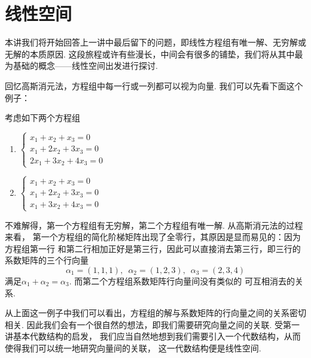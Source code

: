 \chapter{线性空间}

本讲我们将开始回答上一讲中最后留下的问题，即线性方程组有唯一解、无穷解或无解的本质原因.
这段旅程或许有些漫长，中间会有很多的铺垫，我们将从其中最为基础的概念——线性空间出发进行探讨.

回忆高斯消元法，方程组中每一行或一列都可以视为向量. 我们可以先看下面这个例子：
\begin{example}\label{ex:2:线性空间引入}
    考虑如下两个方程组
    \begin{multicols}{2}
        \begin{enumerate}
        \item $\begin{cases}
                x_1+x_2+x_3=0 \\ x_1+2x_2+3x_3=0 \\ 2x_1+3x_2+4x_3=0
            \end{cases}$
        \item $\begin{cases}
                x_1+x_2+x_3=0 \\ x_1+2x_2+3x_3=0 \\ x_1+3x_2+4x_3=0
            \end{cases}$
        \end{enumerate}
    \end{multicols}
    不难解得，第一个方程组有无穷解，第二个方程组有唯一解. 从高斯消元法的过程来看，
    第一个方程组的简化阶梯矩阵出现了全零行，其原因是显而易见的：因为方程组第一行
    和第二行相加正好是第三行，因此可以直接消去第三行，即三行的系数矩阵的三个行向量
    \[\alpha_1=(1,1,1),\enspace\alpha_2=(1,2,3),\enspace\alpha_3=(2,3,4)\]
    满足$\alpha_1+\alpha_2=\alpha_3$. 而第二个方程组系数矩阵行向量间没有类似的
    可互相消去的关系.
\end{example}

从上面这一例子中我们可以看出，方程组的解与系数矩阵的行向量之间的关系密切相关.
因此我们会有一个很自然的想法，即我们需要研究向量之间的关联. 受第一讲基本代数结构的启发，
我们应当自然地想到我们需要引入一个代数结构，从而使得我们可以统一地研究向量间的关联，
这一代数结构便是线性空间.

